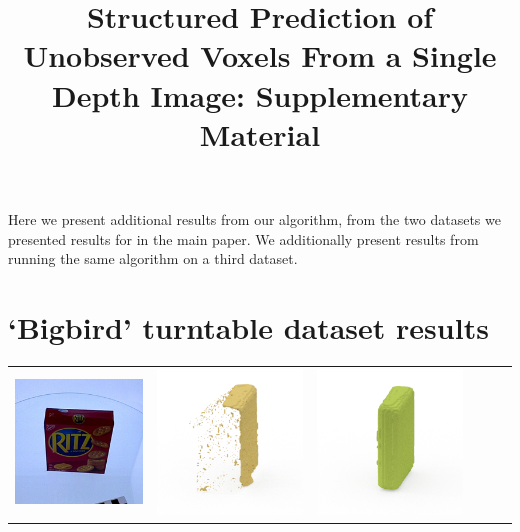 \documentclass[10pt,onecolumn,letterpaper]{article}
\title{Structured Prediction of Unobserved Voxels From a Single Depth Image: Supplementary Material}
\begin{document}
\maketitle

Here we present additional results from our algorithm, from the two datasets we presented results for in the main paper.
We additionally present results from running the same algorithm on a third dataset.

\section{`Bigbird' turntable dataset results}


\newcommand{\turnheight}{0.12\columnwidth}

\begin{tabular}{cccccc}
\includegraphics[height=\turnheight, clip=true, trim=20 30 30 5]{ritz_crackers.png} &
\includegraphics[height=\turnheight, clip=true, trim=60 30 30 5]{ritz_crackers_NP3_0_visible_pixels_view_180.png} &
\includegraphics[height=\turnheight, clip=true, trim=60 30 30 5]{ritz_crackers_NP3_0_gt_view_180.png} &

\end{tabular}
\end{document}

